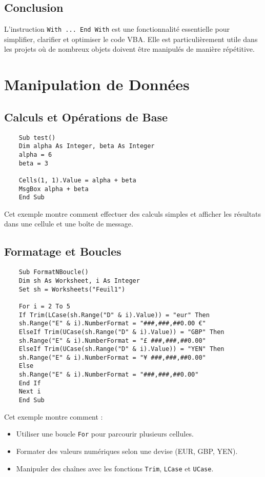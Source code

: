 \documentclass[a4paper,12pt]{report}
\begin{document}
\section{Conclusion}
L'instruction \texttt{With ... End With} est une fonctionnalité essentielle pour simplifier, clarifier et optimiser le code VBA. Elle est particulièrement utile dans les projets où de nombreux objets doivent être manipulés de manière répétitive.


\chapter{Manipulation de Données}

\section{Calculs et Opérations de Base}
\begin{lstlisting}
	Sub test()
	Dim alpha As Integer, beta As Integer
	alpha = 6
	beta = 3
	
	Cells(1, 1).Value = alpha + beta
	MsgBox alpha + beta
	End Sub
\end{lstlisting}
Cet exemple montre comment effectuer des calculs simples et afficher les résultats dans une cellule et une boîte de message.
\newpage
\section{Formatage et Boucles}
\begin{lstlisting}
	Sub FormatNBoucle()
	Dim sh As Worksheet, i As Integer
	Set sh = Worksheets("Feuil1")
	
	For i = 2 To 5
	If Trim(LCase(sh.Range("D" & i).Value)) = "eur" Then
	sh.Range("E" & i).NumberFormat = "###,###,##0.00 €"
	ElseIf Trim(UCase(sh.Range("D" & i).Value)) = "GBP" Then
	sh.Range("E" & i).NumberFormat = "£ ###,###,##0.00"
	ElseIf Trim(UCase(sh.Range("D" & i).Value)) = "YEN" Then
	sh.Range("E" & i).NumberFormat = "¥ ###,###,##0.00"
	Else
	sh.Range("E" & i).NumberFormat = "###,###,##0.00"
	End If
	Next i
	End Sub
\end{lstlisting}

Cet exemple montre comment :
\begin{itemize}
	\item Utiliser une boucle \texttt{For} pour parcourir plusieurs cellules.
	\item Formater des valeurs numériques selon une devise (EUR, GBP, YEN).
	\item Manipuler des chaînes avec les fonctions \texttt{Trim}, \texttt{LCase} et \texttt{UCase}.
\end{itemize}
\end{document}
